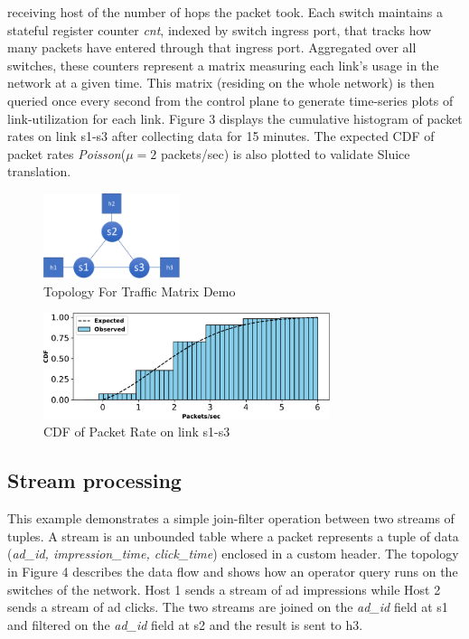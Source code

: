 receiving host of the number of hops the packet took. Each switch maintains a
stateful register counter \textit{cnt}, indexed by switch ingress port, that
tracks how many packets have entered through that ingress port. Aggregated over all switches, these counters represent a matrix measuring each link's
usage in the network at a given time. This matrix (residing on the whole
network) is then queried once every second from the control plane to generate
time-series plots of link-utilization for each link. Figure 3 displays the cumulative histogram of packet rates on link s1-s3 after collecting data for 15 minutes. The expected CDF of packet rates \textit{Poisson}($\mu = 2$
packets/sec) is also plotted to validate Sluice translation.

\begin{figure}[tp]
\centering
\includegraphics[width=40mm,scale=0.7]{figures/traf_mat_topo}
\vspace{-0.15in}
\caption{Topology For Traffic Matrix Demo}
\label{fig:tm}
\vspace{-0.15in}
\end{figure}

\begin{figure}[tp]
\centering
\includegraphics[width=84mm,scale=0.7]{figures/exp_obs_cdf}
\vspace{-0.15in}
\caption{CDF of Packet Rate on link s1-s3}
\vspace{-0.25in}
\end{figure}

\vspace{-0.1in}
\subsection{Stream processing}
 \vspace{-1mm}

This example demonstrates a simple join-filter operation between two streams of
tuples. A stream is an unbounded table where a packet represents a tuple of
data (\textit{ad\_id, impression\_time, click\_time}) enclosed in a custom
header. The topology in Figure 4 describes the data flow and shows how an
operator query runs on the switches of the network. Host 1 sends a stream of ad
impressions while Host 2 sends a stream of ad clicks. The two streams are
joined on the \textit{ad\_id} field at s1 and filtered on the \textit{ad\_id}
field at s2 and the result is sent to h3. 

